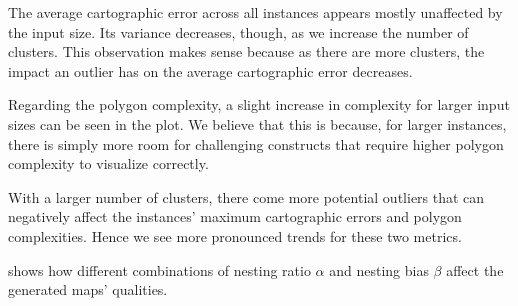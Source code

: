 The average cartographic error across all instances appears mostly unaffected by the input size.
Its variance decreases, though, as we increase the number of clusters.
This observation makes sense because as there are more clusters, the impact an outlier has on the average cartographic error decreases.

Regarding the polygon complexity, a slight increase in complexity for larger input sizes can be seen in the plot.
We believe that this is because, for larger instances, there is simply more room for challenging constructs that require higher polygon complexity to visualize correctly.

With a larger number of clusters, there come more potential outliers that can negatively affect the instances' maximum cartographic errors and polygon complexities.
Hence we see more pronounced trends for these two metrics.

\clearpage

 shows how different combinations of nesting ratio $\alpha$ and nesting bias $\beta$ affect the generated maps' qualities.


